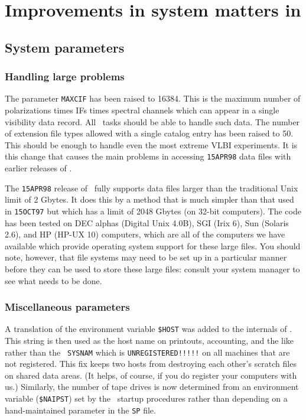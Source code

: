 \section{Improvements in system matters in \AIPRELEASE}

\subsection{System parameters}

\subsubsection{Handling large problems}

The parameter {\tt MAXCIF} has been raised to 16384.  This is the
maximum number of polarizations times IFs times spectral channels
which can appear in a single visibility data record.  All \AIPS\ tasks
should be able to handle such data.  The number of extension file
types allowed with a single catalog entry has been raised to 50.
This should be enough to handle even the most extreme VLBI
experiments.  It is this change that causes the main problems in
accessing {\tt 15APR98} data files with earlier releases of
\hbox{\AIPS}.

The {\tt 15APR98} release of \AIPS\ fully supports data files larger
than the traditional Unix limit of 2 Gbytes.  It does this by a method
that is much simpler than that used in {\tt 15OCT97} but which has a
limit of 2048 Gbytes (on 32-bit computers).  The code has been tested
on DEC alphas (Digital Unix 4.0B), SGI (Irix 6), Sun (Solaris 2.6),
and HP (HP-UX 10) computers, which are all of the computers we have
available which provide operating system support for these large
files.  You should note, however, that file systems may need to be set
up in a particular manner before they can be used to store these large
files: consult your system manager to see what needs to be done.

\subsubsection{Miscellaneous parameters}

A translation of the environment variable {\tt \$HOST} was added to
the internals of \hbox{\AIPS}.  This string is then used as the host
name on printouts, accounting, and the like rather than the {\tt
SYSNAM} which is {\tt UNREGISTERED!!!!!} on all machines that are
not registered.  This fix keeps two hosts from destroying each other's
scratch files on shared data areas.  (It helps, of course, if you do
register your computers with us.)  Similarly, the number of tape
drives is now determined from an environment variable ({\tt \$NAIPST})
set by the \AIPS\ startup procedures rather than depending on a
hand-maintained parameter in the {\tt SP} file.

